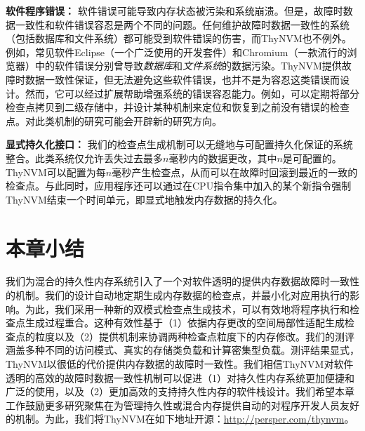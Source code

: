 \textbf{软件程序错误：}
软件错误可能导致内存状态被污染和系统崩溃。但是，故障时数据一致性和软件错误容忍是两个不同的问题。任何维护故障时数据一致性的系统（包括数据库和文件系统）都可能受到软件错误的伤害，而ThyNVM也不例外。例如，常见软件Eclipse（一个广泛使用的开发套件）和Chromium（一款流行的浏览器）中的软件错误分别曾导致\emph{数据库}和\emph{文件系统}的数据污染\cite{eclipse:bug,chrom:bug}。ThyNVM提供故障时数据一致性保证，但无法避免这些软件错误，也并不是为容忍这类错误而设计。然而，它可以经过扩展帮助增强系统的错误容忍能力。例如，可以定期将部分检查点拷贝到二级存储中，并设计某种机制来定位和恢复到之前没有错误的检查点。对此类机制的研究可能会开辟新的研究方向。

\textbf{显式持久化接口：}
我们的检查点生成机制可以无缝地与可配置持久化保证的系统\cite{Ports:2010:TCA:1924943.1924963,
Cipar:2012:LTF:2168836.2168854,
Mickens:2014:BFC:2616448.2616473}整合。此类系统仅允许丢失过去最多$n$毫秒内的数据更改，其中$n$是可配置的。ThyNVM可以配置为每$n$毫秒产生检查点，从而可以在故障时回滚到最近的一致的检查点。与此同时，应用程序还可以通过在CPU指令集中加入的某个新指令强制ThyNVM结束一个时间单元，即显式地触发内存数据的持久化。


\section{本章小结}

我们为混合的持久性内存系统引入了一个对软件透明的提供内存数据故障时一致性的机制。我们的设计自动地定期生成内存数据的检查点，并最小化对应用执行的影响。为此，我们采用一种新的双模式检查点生成技术，可以有效地将程序执行和检查点生成过程重合。这种有效性基于（1）依据内存更改的空间局部性适配生成检查点的粒度以及（2）提供机制来协调两种检查点粒度下的内存修改。我们的测评涵盖多种不同的访问模式、真实的存储类负载和计算密集型负载。测评结果显式，ThyNVM以很低的代价提供内存数据的故障时一致性。我们相信ThyNVM对软件透明的高效的故障时数据一致性机制可以促进（1）对持久性内存系统更加便捷和广泛的使用，以及（2）更加高效的支持持久性内存的软件栈设计。我们希望本章工作鼓励更多研究聚焦在为管理持久性或混合内存提供自动的对程序开发人员友好的机制。为此，我们将ThyNVM在如下地址开源：\url{http://persper.com/thynvm}。


